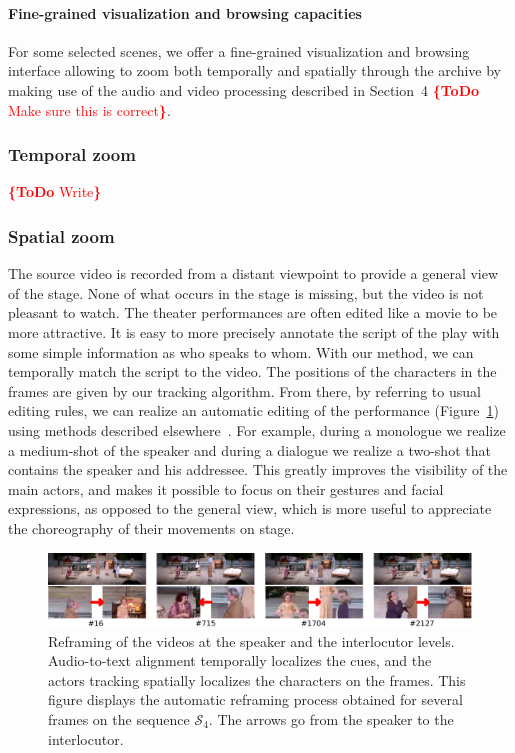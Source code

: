 \documentclass[conference]{IEEEtran}
\newcommand{\todo}[1]{\noindent\textcolor{red}{{\bf \{ToDo} #1{\bf \}}}}
\begin{document}
\paragraph{Fine-grained visualization and browsing capacities}
For some selected scenes, we offer a fine-grained visualization and browsing interface allowing to zoom both temporally and spatially
through the archive by making use of the audio and video processing described in Section~4 \todo{Make sure this is correct}.  

\subsubsection{Temporal zoom} \todo{Write}

\subsubsection{Spatial zoom}
The source video  is recorded from a distant viewpoint  to provide  a general  view of the stage.  None of what occurs in the stage is missing, but the video is not pleasant to watch.  The theater performances are often edited like a movie to be more attractive.   It is easy to more precisely annotate the script of the play with some simple information as who speaks to whom. With our method, we can temporally match the script to the video.  The positions of the characters in the frames are given by our tracking algorithm.  From there, by referring to usual editing rules, we can realize an automatic editing of the performance (Figure~\ref{fig_speaker}) using methods described elsewhere~\cite{Gandhi14}.  For example, during a monologue we realize a medium-shot of the speaker and during a dialogue we realize a two-shot that contains the speaker and his addressee. This greatly improves the visibility of the main actors, and makes it possible to focus on their gestures and facial expressions, as opposed to the general view, which is more useful to appreciate the choreography of their movements on stage.

\begin{figure}[tp]
\centering
\includegraphics[width=\textwidth]{speakers2}
\caption{Reframing of the videos at the speaker and the interlocutor levels. Audio-to-text alignment temporally localizes the cues, and the actors tracking spatially localizes the characters on the frames. 
This figure displays the automatic reframing process obtained for several frames on the sequence $\mathcal{S}_4$. The arrows go from the speaker to the interlocutor.}
\label{fig_speaker}
\end{figure}
\end{document}
